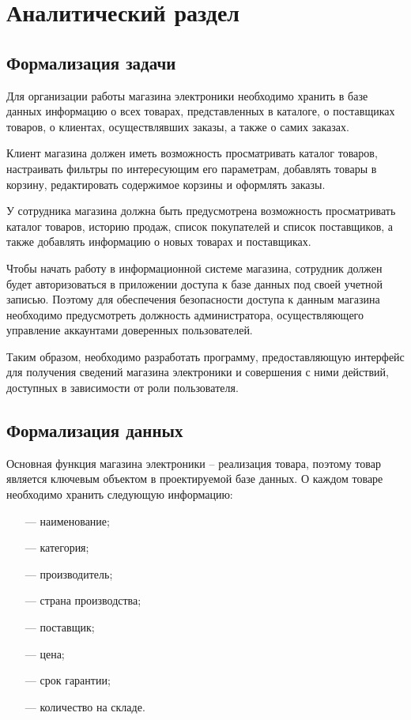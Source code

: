 \section{Аналитический раздел}

\subsection{Формализация задачи}

Для организации работы магазина электроники необходимо хранить в базе данных информацию о всех товарах, представленных в каталоге, о поставщиках товаров, о клиентах, осуществлявших заказы, а также о самих заказах.

Клиент магазина должен иметь возможность просматривать каталог товаров, настраивать фильтры по интересующим его параметрам, добавлять товары в корзину, редактировать содержимое корзины и оформлять заказы. 

У сотрудника магазина должна быть предусмотрена возможность просматривать каталог товаров, историю продаж, список покупателей и список поставщиков, а также добавлять информацию о новых товарах и поставщиках. 

Чтобы начать работу в информационной системе магазина, сотрудник должен будет авторизоваться в приложении доступа к базе данных под своей учетной записью.
Поэтому для обеспечения безопасности доступа к данным магазина необходимо предусмотреть должность администратора, осуществляющего управление аккаунтами доверенных пользователей.

Таким образом, необходимо разработать программу, предоставляющую интерфейс для получения сведений магазина электроники и совершения с ними действий, доступных в зависимости от роли пользователя.

\subsection{Формализация данных}

Основная функция магазина электроники – реализация товара, поэтому товар является ключевым объектом в проектируемой базе данных. О каждом товаре необходимо хранить следующую информацию:

\begin{itemize}[leftmargin=0.7cm +  - ]
	\item[---] наименование;
	\item[---] категория;
	\item[---] производитель;
	\item[---] страна производства;
	\item[---] поставщик;
	\item[---] цена;
	\item[---] срок гарантии;
	\item[---] количество на складе.
\end{itemize}

